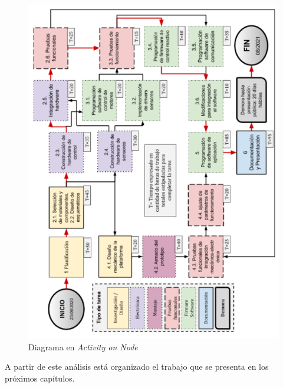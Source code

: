 \begin{figure}[htpb]
\centering 
\includegraphics[width=\textwidth]{./Figures/AoN.png}
\caption{Diagrama en \textit{Activity on Node}}
\label{fig:AoN}
\end{figure}


A partir de este análisis está organizado el trabajo que se presenta en los próximos capítulos.

